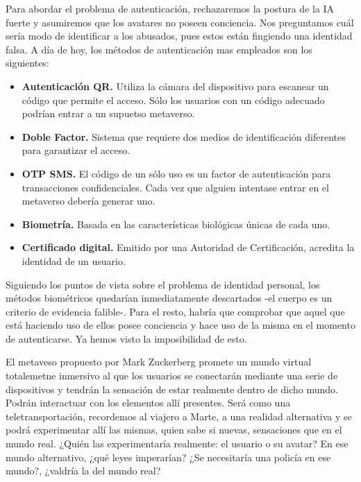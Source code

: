 \documentclass[main.tex]{subfiles}
\begin{document}
Para abordar el problema de autenticación, rechazaremos la postura de la IA fuerte y asumiremos que los avatares no poseen conciencia. 
Nos preguntamos cuál sería modo de identificar a los abusados, pues estos están fingiendo una identidad falsa. A día de hoy, los métodos de autenticación mas empleados son los siguientes:

\begin{itemize}
	\item \textbf{Autenticación QR.} Utiliza la cámara del dispositivo para escanear un código que permite el acceso. Sólo los usuarios con un código adecuado podrían entrar a un supuetso metaverso. 
	
	\item \textbf{Doble Factor.}  Sistema que requiere dos medios de identificación diferentes para garantizar el acceso.
	
	\item \textbf{OTP SMS.} El código de un sólo uso es un factor de autenticación para transacciones confidenciales. Cada vez que alguien intentase entrar en el metaverso debería generar uno.
	
	\item \textbf{Biometría.} Basada en las características biológicas únicas de cada uno. 
	
	\item \textbf{Certificado digital.} Emitido por una Autoridad de Certificación, acredita la identidad de un usuario.
\end{itemize}

Siguiendo los puntos de vista sobre el problema de identidad personal, los métodos biométricos quedarían inmediatamente descartados -el cuerpo es un criterio de evidencia falible-. Para el resto, habría que comprobar que aquel que está haciendo uso de ellos posee conciencia y hace uso de la misma en el momento de autenticarse. Ya hemos visto la imposibilidad de esto. 


El metaveso propuesto por Mark Zuckerberg promete un mundo virtual totalemetne inmersivo al que los usuarios se conectarán mediante una serie de dispositivos y tendrán la sensación de estar realmente dentro de dicho mundo. Podrán interactuar con los elementos allí presentes. Será como una teletransportación, recordemos al viajero a Marte, a una realidad alternativa y se podrá experimentar allí las mismas, quien sabe si nuevas, sensaciones que en el mundo real. ¿Quién las experimentaría realmente: el usuario o su avatar? En ese mundo alternativo, ¿qué leyes imperarían? ¿Se necesitaría una policía en ese mundo?, ¿valdría la del mundo real?
\end{document}
